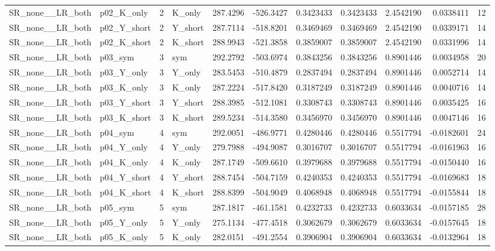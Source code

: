 \begin{table}[!h]
\begin{tabular}[t]{llrlrrrrrrr}
SR\_none\_\_LR\_both & p02\_K\_only & 2 & K\_only & 287.4296 & -526.3427 & 0.3423433 & 0.3423433 & 2.4542190 & 0.0338411 & 12\\
SR\_none\_\_LR\_both & p02\_Y\_short & 2 & Y\_short & 287.7114 & -518.8201 & 0.3469469 & 0.3469469 & 2.4542190 & 0.0339171 & 14\\
SR\_none\_\_LR\_both & p02\_K\_short & 2 & K\_short & 288.9943 & -521.3858 & 0.3859007 & 0.3859007 & 2.4542190 & 0.0331996 & 14\\
\addlinespace
SR\_none\_\_LR\_both & p03\_sym & 3 & sym & 292.2792 & -503.6974 & 0.3843256 & 0.3843256 & 0.8901446 & 0.0034958 & 20\\
SR\_none\_\_LR\_both & p03\_Y\_only & 3 & Y\_only & 283.5453 & -510.4879 & 0.2837494 & 0.2837494 & 0.8901446 & 0.0052714 & 14\\
SR\_none\_\_LR\_both & p03\_K\_only & 3 & K\_only & 287.2224 & -517.8420 & 0.3187249 & 0.3187249 & 0.8901446 & 0.0040716 & 14\\
SR\_none\_\_LR\_both & p03\_Y\_short & 3 & Y\_short & 288.3985 & -512.1081 & 0.3308743 & 0.3308743 & 0.8901446 & 0.0035425 & 16\\
SR\_none\_\_LR\_both & p03\_K\_short & 3 & K\_short & 289.5234 & -514.3580 & 0.3456970 & 0.3456970 & 0.8901446 & 0.0047146 & 16\\
\addlinespace
SR\_none\_\_LR\_both & p04\_sym & 4 & sym & 292.0051 & -486.9771 & 0.4280446 & 0.4280446 & 0.5517794 & -0.0182601 & 24\\
SR\_none\_\_LR\_both & p04\_Y\_only & 4 & Y\_only & 279.7988 & -494.9087 & 0.3016707 & 0.3016707 & 0.5517794 & -0.0161963 & 16\\
SR\_none\_\_LR\_both & p04\_K\_only & 4 & K\_only & 287.1749 & -509.6610 & 0.3979688 & 0.3979688 & 0.5517794 & -0.0150440 & 16\\
SR\_none\_\_LR\_both & p04\_Y\_short & 4 & Y\_short & 288.7454 & -504.7159 & 0.4240353 & 0.4240353 & 0.5517794 & -0.0169683 & 18\\
SR\_none\_\_LR\_both & p04\_K\_short & 4 & K\_short & 288.8399 & -504.9049 & 0.4068948 & 0.4068948 & 0.5517794 & -0.0155844 & 18\\
\addlinespace
SR\_none\_\_LR\_both & p05\_sym & 5 & sym & 287.1817 & -461.1581 & 0.4232733 & 0.4232733 & 0.6033634 & -0.0157185 & 28\\
SR\_none\_\_LR\_both & p05\_Y\_only & 5 & Y\_only & 275.1134 & -477.4518 & 0.3062679 & 0.3062679 & 0.6033634 & -0.0157645 & 18\\
SR\_none\_\_LR\_both & p05\_K\_only & 5 & K\_only & 282.0151 & -491.2554 & 0.3906904 & 0.3906904 & 0.6033634 & -0.0132964 & 18\\

\end{tabular}
\end{table}
